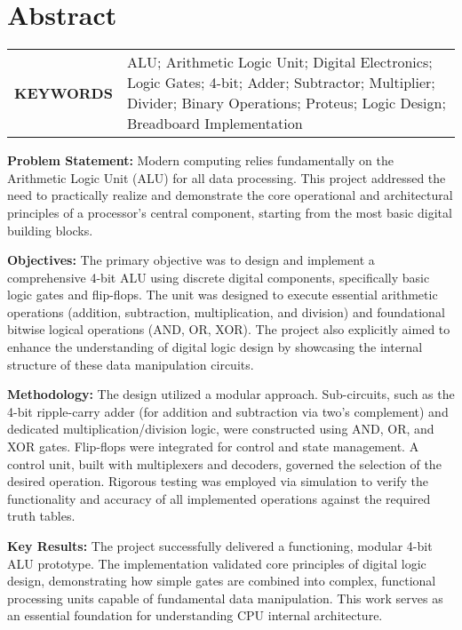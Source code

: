 \chapter{Abstract}
\begin{tabular}{@{} >{\bfseries}p{} p{} @{}}
\MakeUppercase{Keywords} &
ALU; Arithmetic Logic Unit; Digital Electronics; Logic Gates; 4-bit; 
Adder; Subtractor; Multiplier; Divider; Binary Operations; Proteus; 
Logic Design; Breadboard Implementation\\
\end{tabular}
\par

\begin{doublespacing}
\textbf{Problem Statement:} Modern computing relies fundamentally on the Arithmetic Logic Unit (ALU) for all data processing. This project addressed the need to practically realize and demonstrate the core operational and architectural principles of a processor's central component, starting from the most basic digital building blocks.

\textbf{Objectives:} The primary objective was to design and implement a comprehensive 4-bit ALU using discrete digital components, specifically basic logic gates and flip-flops. The unit was designed to execute essential arithmetic operations (addition, subtraction, multiplication, and division) and foundational bitwise logical operations (AND, OR, XOR). The project also explicitly aimed to enhance the understanding of digital logic design by showcasing the internal structure of these data manipulation circuits.

\textbf{Methodology:} The design utilized a modular approach. Sub-circuits, such as the 4-bit ripple-carry adder (for addition and subtraction via two's complement) and dedicated multiplication/division logic, were constructed using AND, OR, and XOR gates. Flip-flops were integrated for control and state management. A control unit, built with multiplexers and decoders, governed the selection of the desired operation. Rigorous testing was employed via simulation to verify the functionality and accuracy of all implemented operations against the required truth tables.

\textbf{Key Results:} The project successfully delivered a functioning, modular 4-bit ALU prototype. The implementation validated core principles of digital logic design, demonstrating how simple gates are combined into complex, functional processing units capable of fundamental data manipulation. This work serves as an essential foundation for understanding CPU internal architecture.
\end{doublespacing}

